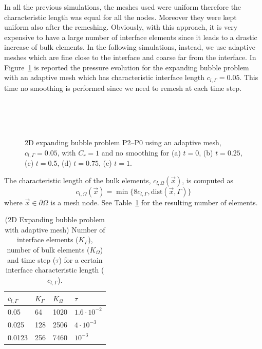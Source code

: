 \documentclass[a4paper,12pt,onecolumn]{article}
\begin{document}
In all the previous simulations, the meshes used were uniform therefore the characteristic length was equal for all the nodes. Moreover they were kept uniform also after the remeshing. Obviously, with this approach, it is very expensive to have a large number of interface elements since it leads to a drastic increase of bulk elements. In the following simulations, instead, we use adaptive meshes which are fine close to the interface and coarse far from the interface. In Figure~\ref{fig:expanding_bubble_adaptive} is reported the pressure evolution for the expanding bubble problem with an adaptive mesh which has characteristic interface length $c_{l,\Gamma}=0.05$. This time no smoothing is performed since we need to remesh at each time step.

\begin{figure}[htbp]
  \centering
  \\
  \quad
  \\
  \quad
  \\
  \caption{2D expanding bubble problem P2--P0 using an adaptive mesh, $c_{l,\Gamma}=0.05$, with $C_r=1$ and no smoothing for (a) $t=0$, (b) $t=0.25$, (c) $t=0.5$, (d) $t=0.75$, (e) $t=1$.}
  \label{fig:expanding_bubble_adaptive}
\end{figure}

The characteristic length of the bulk elements, $c_{l,\Omega}(\vec{x})$, is computed as
\begin{equation}\label{eq:adaptive_criteria}
 c_{l,\Omega}(\vec{x})=\min\big\{8c_{l,\Gamma},\textrm{dist}(\vec{x},\Gamma)\big\}
\end{equation}
where $\vec{x}\in\partial\Omega$ is a mesh node. See Table~\ref{tab:expandingbubble2Delements_adaptive} for the resulting number of elements. 
\begin{table}
 \center
\begin{tabular}{llll}
\hline
$c_{l,\Gamma}$ & $K_\Gamma$ & $K_\Omega$ & $\tau$ \\
\hline
0.05 & 64 & 1020 & $1.6\cdot10^{-2}$ \\
0.025 & 128 & 2506 & $4\cdot10^{-3}$\\
0.0123 & 256 & 7460 & $10^{-3}$\\
\hline
\end{tabular}
\caption{(2D Expanding bubble problem with adaptive mesh) Number of interface elements ($K_\Gamma$), number of bulk elements ($K_\Omega$) and time step ($\tau$) for a certain interface characteristic length ($c_{l,\Gamma}$).}
\label{tab:expandingbubble2Delements_adaptive}
\end{table}
\end{document}
